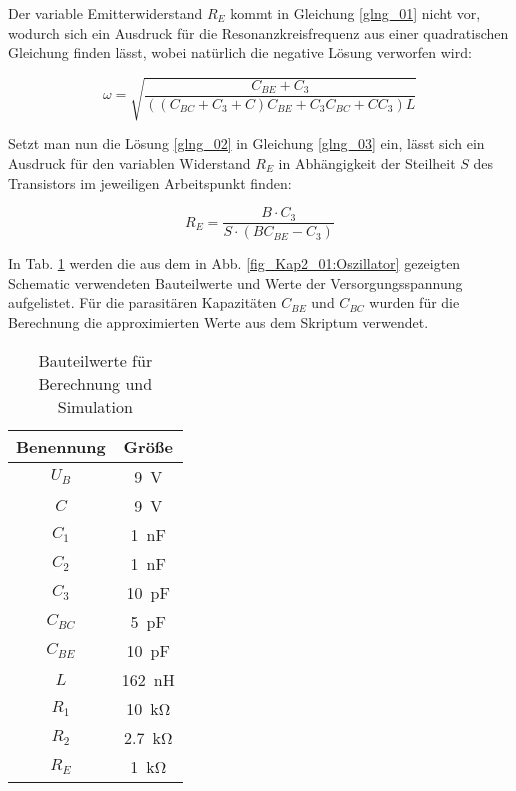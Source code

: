 Der variable Emitterwiderstand $R_E$ kommt in Gleichung \ref{glng_01} nicht vor, wodurch sich ein Ausdruck für die Resonanzkreisfrequenz aus einer quadratischen Gleichung finden lässt, wobei natürlich die negative Lösung verworfen wird: 

\begin{equation}
    \label{glng_02}
    \omega = \sqrt{\frac{C_{BE} + C_3}{\left( \left( C_{BC} + C_3 + C\right)C_{BE} + C_3 C_{BC} + CC_3 \right) L}}
\end{equation}

Setzt man nun die Lösung \ref{glng_02} in Gleichung \ref{glng_03} ein, lässt sich ein Ausdruck für den variablen Widerstand $R_E$ in Abhängigkeit der Steilheit $S$ des Transistors im jeweiligen Arbeitspunkt finden:

\begin{equation}
    R_E = \frac{B \cdot C_3}{S \cdot \left( B C_{BE} - C_3\right)}
\end{equation}

In Tab. \ref{tab_Kap2_01:Bauteilwerte} werden die aus dem in Abb. \ref{fig_Kap2_01:Oszillator} gezeigten Schematic verwendeten Bauteilwerte und Werte der Versorgungsspannung aufgelistet. Für die parasitären Kapazitäten $C_{BE}$ und $C_{BC}$ wurden für die Berechnung die approximierten Werte aus dem Skriptum verwendet.

\begin{table}[H]
\centering
\begin{tabular}{|c|c|} \hline
Benennung & Größe \\ \hline
$U_B$ & \SI{9}{\volt} \\ \hline
$C$ & \SI{9}{\volt} \\ \hline
$C_1$ & \SI{1}{\nano\farad} \\ \hline
$C_2$ & \SI{1}{\nano\farad} \\ \hline
$C_3$ & \SI{10}{\pico\farad} \\ \hline
$C_{BC}$ & \SI{5}{\pico\farad} \\ \hline
$C_{BE}$ & \SI{10}{\pico\farad} \\ \hline
$L$ & \SI{162}{\nano\henry} \\ \hline
$R_1$ & \SI{10}{\kilo\ohm} \\ \hline
$R_2$ & \SI{2.7}{\kilo\ohm} \\ \hline
$R_E$ & \SI{1}{\kilo\ohm} \\ \hline

\end{tabular}
\caption{Bauteilwerte für Berechnung und Simulation}
\label{tab_Kap2_01:Bauteilwerte} 
\end{table}

